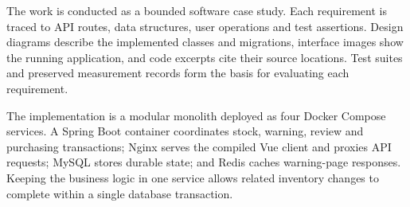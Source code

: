 \documentclass[12pt,a4paper,oneside]{report}
\begin{document}
The work is conducted as a bounded software case study. Each requirement is traced to API routes, data structures, user operations and test assertions. Design diagrams describe the implemented classes and migrations, interface images show the running application, and code excerpts cite their source locations. Test suites and preserved measurement records form the basis for evaluating each requirement.


The implementation is a modular monolith deployed as four Docker Compose services. A Spring Boot container coordinates stock, warning, review and purchasing transactions; Nginx serves the compiled Vue client and proxies API requests; MySQL stores durable state; and Redis caches warning-page responses. Keeping the business logic in one service allows related inventory changes to complete within a single database transaction.

\clearpage{}







\setcounter{table}{0}

\end{document}
